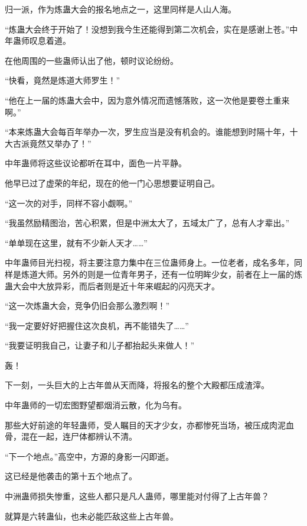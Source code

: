 
\begin{this_body}



归一派，作为炼蛊大会的报名地点之一，这里同样是人山人海。

“炼蛊大会终于开始了！没想到我今生还能得到第二次机会，实在是感谢上苍。”中年蛊师叹息着道。

在他周围的一些蛊师认出了他，顿时议论纷纷。

“快看，竟然是炼道大师罗生！”

“他在上一届的炼蛊大会中，因为意外情况而遗憾落败，这一次他是要卷土重来啊。”

“本来炼蛊大会每百年举办一次，罗生应当是没有机会的。谁能想到时隔十年，十大古派竟然又举办了！”

中年蛊师将这些议论都听在耳中，面色一片平静。

他早已过了虚荣的年纪，现在的他一门心思想要证明自己。

“这一次的对手，同样不容小觑啊。”

“我虽然励精图治，苦心积累，但是中洲太大了，五域太广了，总有人才辈出。”

“单单现在这里，就有不少新人天才……”

中年蛊师目光扫视，将主要注意力集中在三位蛊师身上。一位老者，成名多年，同样是炼道大师。另外的则是一位青年男子，还有一位明眸少女，前者在上一届的炼蛊大会中大放异彩，而后者则是近十年来崛起的闪亮天才。

“这一次炼蛊大会，竞争仍旧会那么激烈啊！”

“我一定要好好把握住这次良机，再不能错失了……”

“我要证明我自己，让妻子和儿子都抬起头来做人！”

轰！

下一刻，一头巨大的上古年兽从天而降，将报名的整个大殿都压成渣滓。

中年蛊师的一切宏图野望都烟消云散，化为乌有。

那些大好前途的年轻蛊师，受人瞩目的天才少女，亦都惨死当场，被压成肉泥血骨，混在一起，连尸体都辨认不清。

“下一个地点。”高空中，方源的身影一闪即逝。

这已经是他袭击的第十五个地点了。

中洲蛊师损失惨重，这些人都只是凡人蛊师，哪里能对付得了上古年兽？

就算是六转蛊仙，也未必能匹敌这些上古年兽。


\end{this_body}
